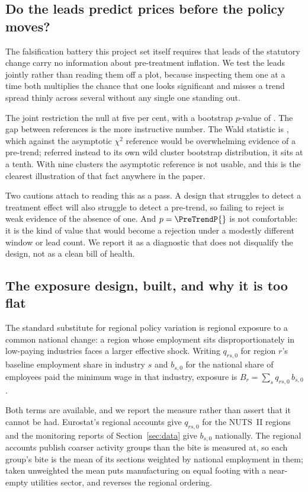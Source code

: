 \subsection{Do the leads predict prices before the policy moves?}

The falsification battery this project set itself requires that leads of the
statutory change carry no information about pre-treatment inflation. We test the
\PreTrendLeads{} leads jointly rather than reading them off a plot, because
inspecting them one at a time both multiplies the chance that one looks
significant and misses a trend spread thinly across several without any single
one standing out.

The joint restriction \PreTrendRejects{} the null at five per cent, with a
bootstrap $p$-value of \PreTrendP{}. The gap between references is the more
instructive number. The Wald statistic is \PreTrendWald{}, which against the
asymptotic $\chi^2$ reference would be overwhelming evidence of a pre-trend;
referred instead to its own wild cluster bootstrap distribution, it sits at a
tenth. With nine clusters the asymptotic reference is not usable, and this is
the clearest illustration of that fact anywhere in the paper.

Two cautions attach to reading this as a pass. A design that struggles to detect
a treatment effect will also struggle to detect a pre-trend, so failing to
reject is weak evidence of the absence of one. And $p=\PreTrendP{}$ is not
comfortable: it is the kind of value that would become a rejection under a
modestly different window or lead count. We report it as a diagnostic that does
not disqualify the design, not as a clean bill of health.

\subsection{The exposure design, built, and why it is too flat}

The standard substitute for regional policy variation is regional exposure to a
common national change: a region whose employment sits disproportionately in
low-paying industries faces a larger effective shock. Writing $q_{rs,0}$ for
region $r$'s baseline employment share in industry $s$ and $b_{s,0}$ for the
national share of employees paid the minimum wage in that industry, exposure is
$B_{r} = \sum_{s} q_{rs,0}\, b_{s,0}$ \citep{goldsmithpinkham2020bartik}.

Both terms are available, and we report the measure rather than assert that it
cannot be had. Eurostat's regional accounts give $q_{rs,0}$ for the
\ExposureRegions{} NUTS~II regions and the monitoring reports of
Section~\ref{sec:data} give $b_{s,0}$ nationally. The regional accounts publish
coarser activity groups than the bite is measured at, so each group's bite is
the mean of its sections weighted by national employment in them; taken
unweighted the mean puts manufacturing on equal footing with a near-empty
utilities sector, and reverses the regional ordering.


